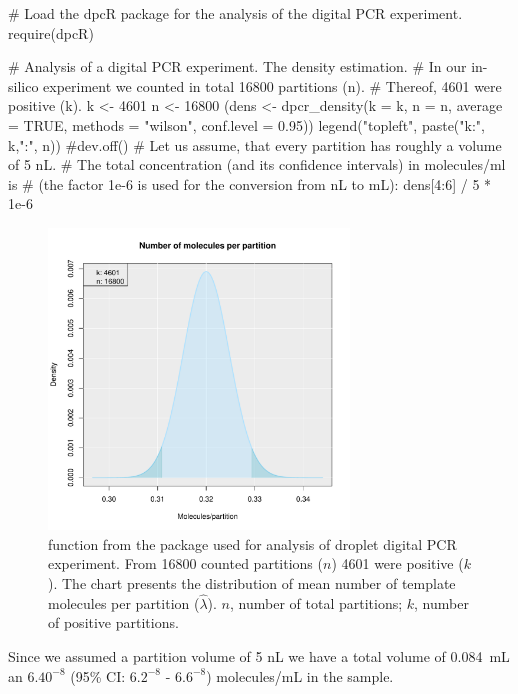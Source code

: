 \begin{example}
# Load the dpcR package for the analysis of the digital PCR experiment.
require(dpcR)

# Analysis of a digital PCR experiment. The density estimation.
# In our in-silico experiment we counted in total 16800 partitions (n). 
# Thereof, 4601 were positive (k).
k <- 4601
n <- 16800
(dens <- dpcr_density(k = k, n = n, average = TRUE, methods = "wilson", 
                      conf.level = 0.95))
legend("topleft", paste("k:", k,"\nn:", n))
#dev.off()
# Let us assume, that every partition has roughly a volume of 5 nL.
# The total concentration (and its confidence intervals) in molecules/ml is
# (the factor 1e-6 is used for the conversion from nL to mL):
dens[4:6] / 5 * 1e-6
\end{example}

\begin{figure}[htbp]
  \centering
  \includegraphics[clip=true, trim=0.15cm 0.55cm 1cm 1.8cm, width=8cm]{figures/dpcR.pdf}
  \caption{ function from the  package used 
for analysis of droplet digital PCR experiment. From 16800 counted partitions 
($n$) 4601 were positive ($k$). The chart presents the distribution of mean 
number of template molecules per partition ($\hat \lambda$). $n$, number of 
total partitions; $k$, number of positive partitions.
}
  \label{figure:dpcR}
\end{figure}

Since we assumed a partition volume of 5 nL we have a total volume of 0.084~mL 
an $6.40^{-8}$ (95\% CI: $6.2^{-8}$ - $6.6^{-8}$) molecules/mL in the 
sample.

